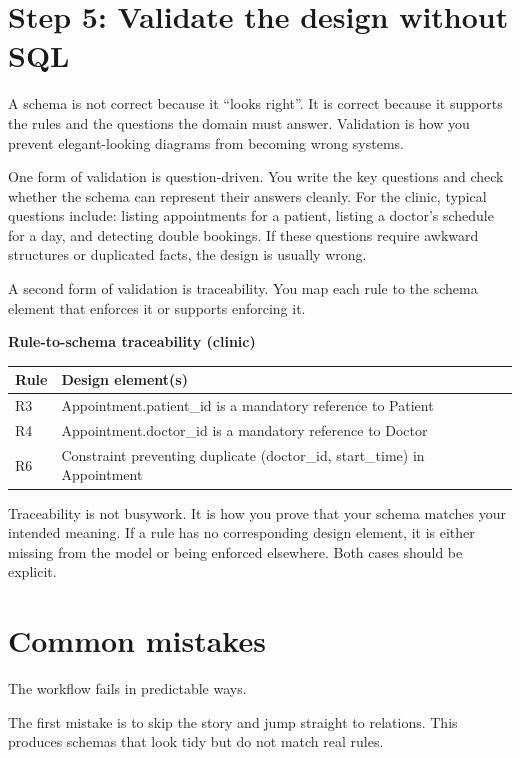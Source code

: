 \section{Step 5: Validate the design without SQL}
A schema is not correct because it “looks right”.
It is correct because it supports the rules and the questions the domain must answer.
Validation is how you prevent elegant-looking diagrams from becoming wrong systems.

One form of validation is question-driven.
You write the key questions and check whether the schema can represent their answers cleanly.
For the clinic, typical questions include: listing appointments for a patient, listing a doctor’s schedule for a day, and detecting double bookings.
If these questions require awkward structures or duplicated facts, the design is usually wrong.

A second form of validation is traceability.
You map each rule to the schema element that enforces it or supports enforcing it.

\begin{examplebox}
\textbf{Rule-to-schema traceability (clinic)}\\[4pt]
\begin{tabularx}{\textwidth}{@{}lX@{}}
\toprule
Rule & Design element(s) \\
\midrule
R3 & Appointment.patient\_id is a mandatory reference to Patient \\
R4 & Appointment.doctor\_id is a mandatory reference to Doctor \\
R6 & Constraint preventing duplicate (doctor\_id, start\_time) in Appointment \\
\bottomrule
\end{tabularx}
\end{examplebox}

Traceability is not busywork.
It is how you prove that your schema matches your intended meaning.
If a rule has no corresponding design element, it is either missing from the model or being enforced elsewhere.
Both cases should be explicit.

\section{Common mistakes}
The workflow fails in predictable ways.

The first mistake is to skip the story and jump straight to relations.
This produces schemas that look tidy but do not match real rules.

